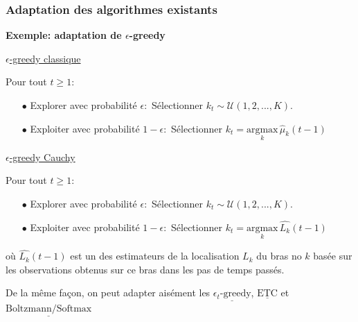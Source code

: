 \documentclass[8pt, sans]{beamer}
\begin{document}
\begin{frame}
\frametitle{Adaptation des algorithmes existants}
\pause

\textbf{Exemple: adaptation de $\epsilon$-greedy}

\vfill
\pause

\underline{$\epsilon$-greedy classique}\\

\vfill
\pause

Pour tout $t\geq 1:$

\begin{itemize}
\item[$\bullet$] Explorer avec probabilité $\epsilon:$ Sélectionner $k_t\sim\mathcal{U}({1,2,...,K}).$
\item[$\bullet$] Exploiter avec probabilité $1-\epsilon:$ Sélectionner $k_t=\underset{k}{\mathrm{argmax}}\, \hat{\mu}_k(t-1)$
\end{itemize}

\pause
\vfill

\underline{$\epsilon$-greedy Cauchy}

\pause
\vfill
Pour tout $t\geq 1:$

\begin{itemize}
\item[$\bullet$] Explorer avec probabilité $\epsilon:$ Sélectionner $k_t\sim\mathcal{U}({1,2,...,K}).$
\item[$\bullet$] Exploiter avec probabilité $1-\epsilon:$ Sélectionner $k_t=\underset{k}{\mathrm{argmax}}\, \widehat{L_k}(t-1)$
\end{itemize}

\vfill

où $\widehat{L_k}(t-1)$ est un des estimateurs de la localisation $L_k$ du bras no $k$ basée sur les observations obtenus sur ce bras dans les pas de temps passés.

\pause
\vfill

De la même façon, on peut adapter aisément les $\underline{\epsilon_t\text{-greedy}}$,
$\underline{\text{ETC}}$ et $\underline{\text{Boltzmann/Softmax}}$ 

\end{frame}
\end{document}
